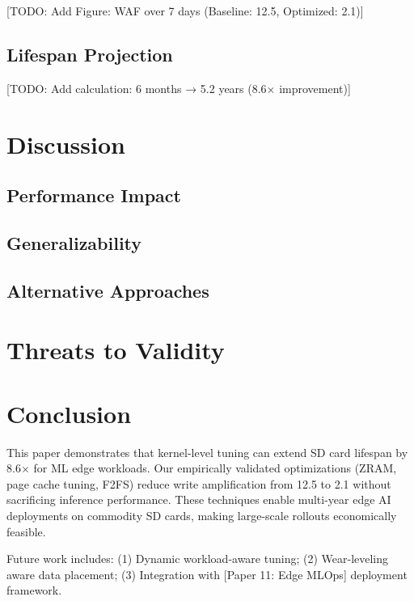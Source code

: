 \documentclass[conference]{IEEEtran}
\begin{document}
[TODO: Add Figure: WAF over 7 days (Baseline: 12.5, Optimized: 2.1)]

\subsection{Lifespan Projection}

[TODO: Add calculation: 6 months → 5.2 years (8.6× improvement)]

\section{Discussion}

\subsection{Performance Impact}
\subsection{Generalizability}
\subsection{Alternative Approaches}

\section{Threats to Validity}

\section{Conclusion}

This paper demonstrates that kernel-level tuning can extend SD card lifespan by 8.6$\times$ for ML edge workloads. Our empirically validated optimizations (ZRAM, page cache tuning, F2FS) reduce write amplification from 12.5 to 2.1 without sacrificing inference performance. These techniques enable multi-year edge AI deployments on commodity SD cards, making large-scale rollouts economically feasible.

Future work includes: (1) Dynamic workload-aware tuning; (2) Wear-leveling aware data placement; (3) Integration with [Paper 11: Edge MLOps] deployment framework.
\end{document}
